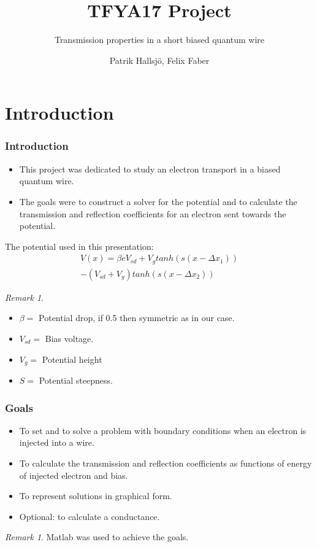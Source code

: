 \documentclass[•]{beamer}
\subtitle{Transmission properties in a short biased quantum wire}
\title{TFYA17 Project}
\author{Patrik Hallsj\"{o}, Felix Faber}
\date{}
\theoremstyle{remark}
\newtheorem{remark}[theorem]{Remark}
\begin{document}
\begin{frame}
\titlepage
\end{frame}
\begin{frame}
\tableofcontents
\end{frame}
\section{Introduction}
\begin{frame}[shrink=10]\frametitle{Introduction}
\begin{block}

\begin{itemize}
\item This project was dedicated to study an electron transport in a biased quantum wire.
\item The goals were to construct a solver for the potential and to calculate the transmission and reflection coefficients for an electron sent towards the potential.
\end{itemize}
\end{block}
\end{frame}

\begin{frame}
\begin{block}

The potential used in this presentation:
\begin{eqnarray*}
\label{potential}
V(x) = \beta e V_{sd}+V_{g}tanh(s(x-\Delta x_{1}))\\
-(V_{sd}+V_{g})tanh(s(x-\Delta x_{2}))
\end{eqnarray*}
\end{block}
\begin{remark}
\begin{itemize}
\item $\beta=$ Potential drop, if 0.5 then symmetric as in our case.
\item $V_{sd} =$ Bias voltage.
\item $V_g =$ Potential height
\item $S=$ Potential steepness.
\end{itemize}
\end{remark}
\end{frame}
\begin{frame}\frametitle{Goals}
\begin{block}

\begin{itemize}
\item To set and to solve a problem with boundary conditions when an electron is injected into a wire.
\pause
\item To calculate the transmission and reflection coefficients as functions of energy of injected electron and bias.
\pause
\item To represent solutions in graphical form.
\pause
\item Optional: to calculate a conductance.
\end{itemize}
\end{block}
\pause
\begin{remark}
Matlab was used to achieve the goals.
\end{remark}
\end{frame}
\end{document}
